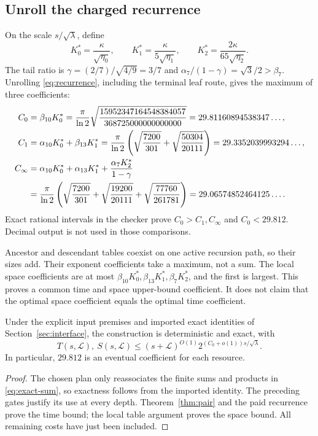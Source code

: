 \subsection{Unroll the charged recurrence}

On the scale $s/\sqrt\lambda$, define
\[
 K_0^*=\frac\kappa{\sqrt{\eta_0}},\qquad
 K_1^*=\frac\kappa{5\sqrt{\eta_1}},\qquad
 K_2^*=\frac{2\kappa}{65\sqrt{\eta_2}}.
\]
The tail ratio is $\gamma=(2/7)/\sqrt{4/9}=3/7$ and
$\alpha_7/(1-\gamma)=\sqrt3/2>\beta_7$. Unrolling
\eqref{eq:recurrence}, including the terminal leaf route, gives the maximum
of three coefficients:
\begin{align}
 C_0&=\beta_{10}K_0^*
 =\frac\pi{\ln2}\sqrt{\frac{15952347164548384057}{368725000000000000}}
 =29.81160894538347\ldots,\label{eq:C0}\\
 C_1&=\alpha_{10}K_0^*+\beta_{13}K_1^*
 =\frac\pi{\ln2}\left(\sqrt{\frac{7200}{301}}+
                       \sqrt{\frac{50304}{20111}}\right)
 =29.3352039993294\ldots,\label{eq:C1}\\
 C_\infty&=\alpha_{10}K_0^*+\alpha_{13}K_1^*
              +\frac{\alpha_7K_2^*}{1-\gamma}\notag\\
 &=\frac\pi{\ln2}\left(\sqrt{\frac{7200}{301}}+
          \sqrt{\frac{19200}{20111}}+
          \sqrt{\frac{77760}{261781}}\right)
 =29.06574852464125\ldots.\label{eq:Cinf}
\end{align}
Exact rational intervals in the checker prove $C_0>C_1,C_\infty$ and
$C_0<29.812$. Decimal output is not used in those comparisons.

Ancestor and descendant tables coexist on one active recursion path, so
their sizes add. Their exponent coefficients take a maximum, not a sum.
The local space coefficients are at most
$\beta_{10}K_0^*,\beta_{13}K_1^*,\beta_7K_2^*$, and the first is largest.
This proves a common time and space upper-bound coefficient. It does not
claim that the optimal space coefficient equals the optimal time coefficient.

\begin{theorem}\label{thm:cached}
Under the explicit input premises and imported exact identities of
Section~\ref{sec:interface}, the construction is deterministic and exact,
with
\[
 T(s,\mathcal L),\ S(s,\mathcal L)
 \le (s+\mathcal L)^{O(1)}2^{(C_0+o(1))s/\sqrt\lambda}.
\]
In particular, $29.812$ is an eventual coefficient for each resource.
\end{theorem}
\begin{proof}
The chosen plan only reassociates the finite sums and products in
\eqref{eq:exact-sum}, so exactness follows from the imported identity.
The preceding gates justify its use at every depth. Theorem~\ref{thm:pair}
and the paid recurrence prove the time bound; the local table argument
proves the space bound. All remaining costs have just been included.
\end{proof}
